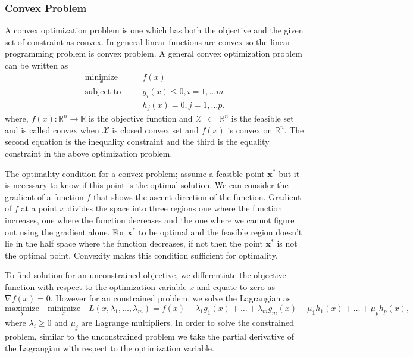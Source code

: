 \documentclass[a4paper, 12pt,titlepage]{dithesis} %
\newcommand{\me}[1]{\( #1 \)}
\begin{document}
\subsubsection{Convex Problem}

A convex optimization problem is one which has both the objective and the given set of constraint as convex. In general linear functions are convex so the linear programming problem is convex problem. A general convex optimization problem can be written as
\begin{eqnarray}
\underset{x}{\text{minimize}} \quad && f(x) \\
\text{subject to} \quad && g_i(x) \leq 0, i = 1,...m\\
&& h_j(x) = 0, j = 1,...p.
\end{eqnarray}
where, \me{f(x): {\mathbb{R}^n} \rightarrow {\mathbb{R}}} is the objective function and \me{\mathcal{X}} \me{\subset} \me{{\mathbb{R}^n}} is the feasible set and is called convex when \me{\mathcal{X}} is closed convex set and \me{f(x)} is convex on \me{{\mathbb{R}^n}}. The second equation is the inequality constraint and the third is the equality constraint in the above optimization problem.
\par
The optimality condition for a convex problem; assume a feasible point \me{\mathbf{x}^*} but it is necessary to know if this point is the optimal solution. We can consider the gradient of a function \me{f} that shows the ascent direction of the function. Gradient of \me{f} at a point \me{x} divides the space into three regions one where the function increases, one where the function decreases and the one where we cannot figure out using the gradient alone. For \me{\mathbf{x}^*} to be optimal and the feasible region doesn't lie in the half space where the function decreases, if not then the point \me{\mathbf{x}^*} is not the optimal point. Convexity makes this condition sufficient for optimality. 
\par
To find solution for an unconstrained objective, we differentiate the objective function with respect to the optimization variable \me{x} and equate to zero as \me{\nabla f(x) = 0}. However for an constrained problem, we solve the Lagrangian as
\begin{equation}
\underset{\lambda}{\text{maximize}} \quad \underset{x}{\text{minimize}} \quad  L(x,\lambda_1, \dotsc,\lambda_m) =  f(x) + \lambda_1 g_1(x) + \dotsc + \lambda_m g_m(x) + \mu_1 h_1 (x) + \dotsc + \mu_p h_p(x),
\end{equation}
where \me{\lambda_i \geq 0} and \me{\mu_j} are Lagrange multipliers. In order to solve the constrained problem, similar to the unconstrained problem we take the partial derivative of the Lagrangian with respect to the optimization variable.
\end{document}

